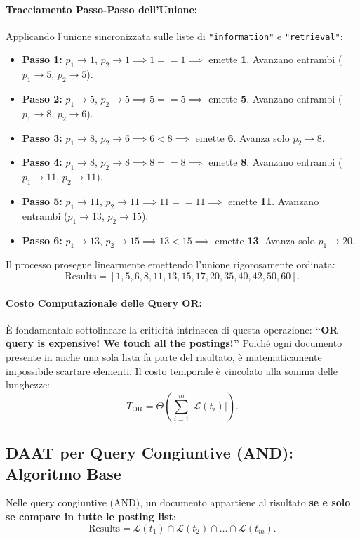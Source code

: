 \paragraph{Tracciamento Passo-Passo dell'Unione:}
Applicando l'unione sincronizzata sulle liste di \texttt{"information"} e \texttt{"retrieval"}:
\begin{itemize}
    \item \textbf{Passo 1:} $p_1 \to 1$, $p_2 \to 1 \implies 1 == 1 \implies$ emette \textbf{1}. Avanzano entrambi ($p_1 \to 5$, $p_2 \to 5$).
    \item \textbf{Passo 2:} $p_1 \to 5$, $p_2 \to 5 \implies 5 == 5 \implies$ emette \textbf{5}. Avanzano entrambi ($p_1 \to 8$, $p_2 \to 6$).
    \item \textbf{Passo 3:} $p_1 \to 8$, $p_2 \to 6 \implies 6 < 8 \implies$ emette \textbf{6}. Avanza solo $p_2 \to 8$.
    \item \textbf{Passo 4:} $p_1 \to 8$, $p_2 \to 8 \implies 8 == 8 \implies$ emette \textbf{8}. Avanzano entrambi ($p_1 \to 11$, $p_2 \to 11$).
    \item \textbf{Passo 5:} $p_1 \to 11$, $p_2 \to 11 \implies 11 == 11 \implies$ emette \textbf{11}. Avanzano entrambi ($p_1 \to 13$, $p_2 \to 15$).
    \item \textbf{Passo 6:} $p_1 \to 13$, $p_2 \to 15 \implies 13 < 15 \implies$ emette \textbf{13}. Avanza solo $p_1 \to 20$.
\end{itemize}
Il processo prosegue linearmente emettendo l'unione rigorosamente ordinata:
\[
\text{Results} = [1, 5, 6, 8, 11, 13, 15, 17, 20, 35, 40, 42, 50, 60].
\]

\paragraph{Costo Computazionale delle Query OR:}
\`E fondamentale sottolineare la criticit\`a intrinseca di questa operazione: \textbf{``OR query is expensive! We touch all the postings!''} Poich\'e ogni documento presente in anche una sola lista fa parte del risultato, \`e matematicamente impossibile scartare elementi. Il costo temporale \`e vincolato alla somma delle lunghezze:
\begin{equation}
T_{\text{OR}} = \Theta \left( \sum_{i=1}^m |\mathcal{L}(t_i)| \right).
\end{equation}

\FloatBarrier
\subsection{DAAT per Query Congiuntive (AND): Algoritmo Base}
Nelle query congiuntive (AND), un documento appartiene al risultato \textbf{se e solo se compare in tutte le posting list}:
\begin{equation}
\text{Results} = \mathcal{L}(t_1) \cap \mathcal{L}(t_2) \cap \dots \cap \mathcal{L}(t_m).
\end{equation}

